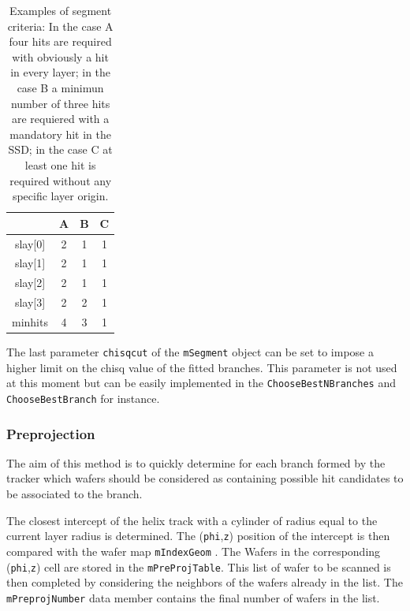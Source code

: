\documentclass[twoside]{article}
\begin{document}
\begin{table}[h]
\begin{center}
\begin{tabular}{|c|c|c|c|}\hline
 & A & B & C\\ \hline 
slay[0] & 2 & 1 & 1\\ \hline 
slay[1] & 2 & 1 & 1\\ \hline 
slay[2] & 2 & 1 & 1\\ \hline 
slay[3] & 2 & 2 & 1\\ \hline 
minhits & 4 & 3 & 1\\ \hline 
\end{tabular}
\end{center}
\caption{Examples of segment criteria: In the case A four hits are required 
with obviously a hit in every layer; in the case B a minimun number of
three hits are requiered with a mandatory hit in the SSD; in the case
C at least one hit is required without any specific layer origin.}
\label{tab:seg}
\end{table}

The last parameter \verb+chisqcut+ of the \verb+mSegment+ object can
be set to impose a higher limit on the chisq value of the fitted
branches.  This parameter is not used at this moment but can be easily
implemented in the \verb+ChooseBestNBranches+ 
 and \verb+ChooseBestBranch+ 
 for instance.

\subsubsection{Preprojection}
\label{sec:Preprojectionq}
The aim of this method is to quickly determine for each branch formed
by the tracker which wafers should be considered as containing
possible hit candidates to be associated to the branch.

The closest intercept of the helix track with a cylinder of radius
equal to the current layer radius is determined. The
(\verb+phi+,\verb+z+) position of the intercept is then compared with
the wafer map \verb+mIndexGeom+ . The Wafers
in the corresponding (\verb+phi+,\verb+z+) cell are stored in the
\verb+mPreProjTable+. This list of wafer 
to be scanned is then completed by considering the neighbors of the
wafers already in the list. The \verb+mPreprojNumber+ data member
contains the final number of wafers in the list.
\end{document}
